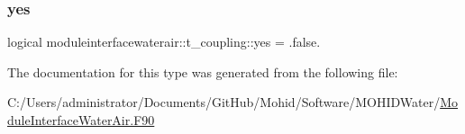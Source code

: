 \subsubsection{\texorpdfstring{yes}{yes}}
{\footnotesize\ttfamily logical moduleinterfacewaterair\+::t\+\_\+coupling\+::yes = .false.\hspace{0.3cm}{\ttfamily [private]}}



The documentation for this type was generated from the following file\+:\begin{DoxyCompactItemize}
\item 
C\+:/\+Users/administrator/\+Documents/\+Git\+Hub/\+Mohid/\+Software/\+M\+O\+H\+I\+D\+Water/\mbox{\hyperlink{_module_interface_water_air_8_f90}{Module\+Interface\+Water\+Air.\+F90}}\end{DoxyCompactItemize}
